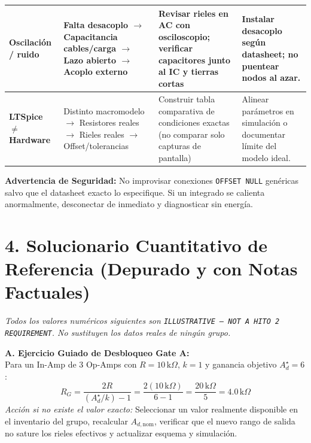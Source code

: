 \documentclass[10pt, a4paper]{article}
\begin{document}
\begin{table}[htbp]
\begin{tabularx}{\textwidth}{|>{\raggedright\arraybackslash}p{2.5cm}|>{\raggedright\arraybackslash}p{4.3cm}|>{\raggedright\arraybackslash}X|>{\raggedright\arraybackslash}p{3.8cm}|}
    \textbf{Oscilación / ruido} & Falta desacoplo $\rightarrow$ Capacitancia cables/carga $\rightarrow$ Lazo abierto $\rightarrow$ Acoplo externo & Revisar rieles en AC con osciloscopio; verificar capacitores junto al IC y tierras cortas & Instalar desacoplo según datasheet; no puentear nodos al azar. \\ \hline
    \textbf{LTSpice $\neq$ Hardware} & Distinto macromodelo $\rightarrow$ Resistores reales $\rightarrow$ Rieles reales $\rightarrow$ Offset/tolerancias & Construir tabla comparativa de condiciones exactas (no comparar solo capturas de pantalla) & Alinear parámetros en simulación o documentar límite del modelo ideal. \\ \hline
    \end{tabularx}
\end{table}
\noindent\textbf{Advertencia de Seguridad:} No improvisar conexiones \texttt{OFFSET NULL} genéricas salvo que el datasheet exacto lo especifique. Si un integrado se calienta anormalmente, desconectar de inmediato y diagnosticar sin energía.

\newpage
\section*{4. Solucionario Cuantitativo de Referencia (Depurado y con Notas Factuales)}
\textit{Todos los valores numéricos siguientes son \texttt{ILLUSTRATIVE — NOT A HITO 2 REQUIREMENT}. No sustituyen los datos reales de ningún grupo.}

\textbf{A. Ejercicio Guiado de Desbloqueo Gate A:} \\
Para un In-Amp de 3 Op-Amps con $R=10\,\text{k}\Omega$, $k=1$ y ganancia objetivo $A_d^\star = 6$:
\begin{equation*}
    R_G = \frac{2R}{(A_d^\star / k) - 1} = \frac{2(10\,\text{k}\Omega)}{6 - 1} = \frac{20\,\text{k}\Omega}{5} = \boxed{4.0\,\text{k}\Omega}
\end{equation*}
\textit{Acción si no existe el valor exacto:} Seleccionar un valor realmente disponible en el inventario del grupo, recalcular $A_{d,\mathrm{nom}}$, verificar que el nuevo rango de salida no sature los rieles efectivos y actualizar esquema y simulación.
\end{document}
